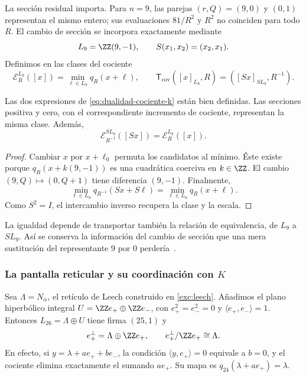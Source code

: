 La sección residual importa. Para \(n=9\), las parejas
\((r,Q)=(9,0)\) y \((0,1)\) representan el mismo entero;
sus evaluaciones \(81/R^2\) y \(R^2\) no coinciden para todo
\(R\). El cambio de sección se incorpora exactamente mediante
\[
 L_9=\ZZ(9,-1),\qquad S(x_1,x_2)=(x_2,x_1).
\]
Definimos en las clases del cociente
\begin{equation}
 \mathcal E_R^{L_9}([x])=\min_{\ell\in L_9}q_R(x+\ell),
 \qquad
 \mathsf T_{\mathrm{cov}}([x]_{L_9},R)
       =([Sx]_{SL_9},R^{-1}).
 \label{eq:dualidad-cociente-k}
\end{equation}

\begin{proposition}
Las dos expresiones de \eqref{eq:dualidad-cociente-k} están bien
definidas. Las secciones positiva y cero, con el correspondiente
incremento de cociente, representan la misma clase. Además,
\[
 \mathcal E_{R^{-1}}^{SL_9}([Sx])=\mathcal E_R^{L_9}([x]).
\]
\end{proposition}
\begin{proof}
Cambiar \(x\) por \(x+\ell_0\) permuta los candidatos al mínimo.
Éste existe porque \(q_R(x+k(9,-1))\) es una cuadrática coerciva
en \(k\in\ZZ\). El cambio \((9,Q)\mapsto(0,Q+1)\)
tiene diferencia \((9,-1)\). Finalmente,
\[
 \min_{\ell\in L_9}q_{R^{-1}}(Sx+S\ell)
 =\min_{\ell\in L_9}q_R(x+\ell).
\]
Como \(S^2=I\), el intercambio inverso recupera la clase y la escala.
\end{proof}

La igualdad depende de transportar también la relación de equivalencia,
de \(L_9\) a \(SL_9\). Así se conserva la información del cambio
de sección que una mera sustitución del representante \(9\) por
\(0\) perdería~\cite{hmtedicionintegral}.

\subsubsection{La pantalla reticular y su coordinación con \(K\)}

Sea \(\Lambda=N_\alpha\), el retículo de Leech construido en
\ref{exc:leech}. Añadimos el plano hiperbólico integral
\(U=\ZZ e_+\oplus\ZZ e_-\), con
\(e_+^2=e_-^2=0\) y \(\langle e_+,e_-\rangle=1\).
Entonces \(L_{26}=\Lambda\oplus U\) tiene firma \((25,1)\) y
\[
 e_+^\perp=\Lambda\oplus\ZZ e_+,
 \qquad e_+^\perp/\ZZ e_+\cong\Lambda.
\]
En efecto, si \(y=\lambda+ae_++be_-\), la condición
\(\langle y,e_+\rangle=0\) equivale a \(b=0\), y el cociente
elimina exactamente el sumando \(ae_+\). Su mapa es
\(q_{24}(\lambda+ae_+)=\lambda\).

